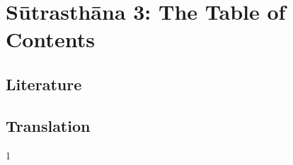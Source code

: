 
\chapter{Sūtrasthāna 3: The Table of Contents}


\section{Literature}

\section{Translation}

\begin{translation}    
    \item [1] 
    
\end{translation}



